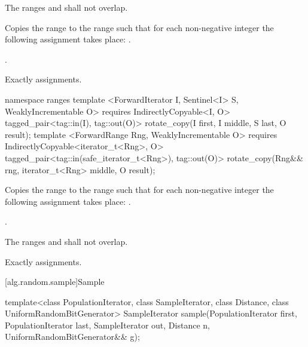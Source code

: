 \begin{itemdescr}
\pnum
\requires
The ranges
and
shall not overlap.

\pnum
\effects
Copies the range
to the range
such that for each non-negative integer
the following assignment takes place:
.

\pnum
\returns
{}.

\pnum
\complexity
Exactly
assignments.
\end{itemdescr}

\begin{addedblock}
%
\begin{itemdecl}
namespace ranges {
  template <ForwardIterator I, Sentinel<I> S, WeaklyIncrementable O>
      requires IndirectlyCopyable<I, O>
    tagged_pair<tag::in(I), tag::out(O)> rotate_copy(I first, I middle, S last, O result);
  template <ForwardRange Rng, WeaklyIncrementable O>
      requires IndirectlyCopyable<iterator_t<Rng>, O>
    tagged_pair<tag::in(safe_iterator_t<Rng>), tag::out(O)>
      rotate_copy(Rng&& rng, iterator_t<Rng> middle, O result);
}
\end{itemdecl}

\begin{itemdescr}
\pnum
\effects
Copies the range
to the range
such that for each non-negative integer
the following assignment takes place:
.

\pnum
\returns
{}.

\pnum
\requires
The ranges
and
shall not overlap.

\pnum
\complexity
Exactly
assignments.
\end{itemdescr}
\end{addedblock}

[alg.random.sample]{Sample}

%
\begin{itemdecl}
template<class PopulationIterator, class SampleIterator,
         class Distance, class UniformRandomBitGenerator>
  SampleIterator sample(PopulationIterator first, PopulationIterator last,
                        SampleIterator out, Distance n,
                        UniformRandomBitGenerator&& g);
\end{itemdecl}

